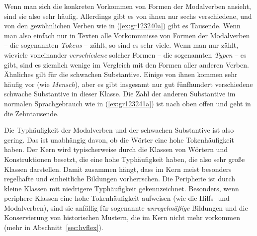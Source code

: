 Wenn man sich die konkreten Vorkommen von Formen der Modalverben ansieht, sind sie also sehr häufig.
Allerdings gibt es von ihnen nur sechs verschiedene, und von den gewöhnlichen Verben wie in (\ref{ex:gr123240a}) gibt es Tausende.
Wenn man also einfach nur in Texten alle Vorkommnisse von Formen der Modalverben -- die sogenannten \textit{Tokens} -- zählt, so sind es sehr viele.
Wenn man nur zählt, wieviele voneinander \textit{verschiedene} solcher Formen -- die sogenannten \textit{Typen} -- es gibt, sind es ziemlich wenige im Vergleich mit den Formen aller anderen Verben.
Ähnliches gilt für die schwachen Substantive.
Einige von ihnen kommen sehr häufig vor (wie \textit{Mensch}), aber es gibt insgesamt nur gut fünfhundert verschiedene schwache Substantive in dieser Klasse.
Die Zahl der anderen Substantive im normalen Sprachgebrauch wie in (\ref{ex:gr123241a}) ist nach oben offen und geht in die Zehntausende.


Die Typhäufigkeit der Modalverben und der schwachen Substantive ist also gering.
Das ist unabhängig davon, ob die Wörter eine hohe Tokenhäufigkeit haben.
Der Kern wird typischerweise durch die Klassen von Wörtern und Konstruktionen besetzt, die eine hohe Typhäufigkeit haben, die also sehr große Klassen darstellen.
Damit zusammen hängt, dass im Kern meist besonders regelhafte und einheitliche Bildungen vorherrschen.
Die Peripherie ist durch kleine Klassen mit niedrigere Typhäufigkeit gekennzeichnet.
Besonders, wenn periphere Klassen eine hohe Tokenhäufigkeit aufweisen (wie die Hilfs- und Modalverben), sind sie anfällig für sogenannte \textit{unregelmäßige} Bildungen und die Konservierung von historischen Mustern, die im Kern nicht mehr vorkommen (mehr in Abschnitt~\ref{sec:hvflex}).



